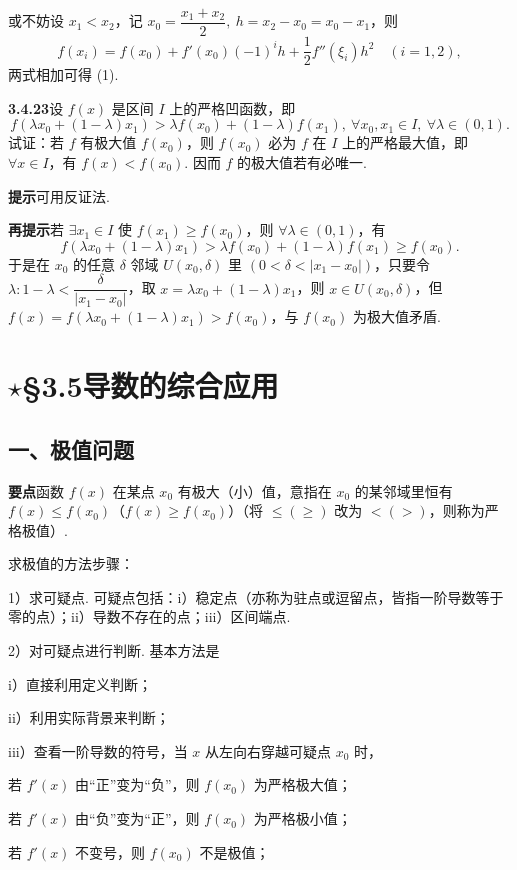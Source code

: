 \documentclass[UTF8,12pt,a4paper,fontset=fandol]{ctexart}
\begin{document}
或不妨设 $x_1<x_2$，记 $x_0=\dfrac{x_1+x_2}2,\ h=x_2-x_0=x_0-x_1$，则
\[
  f(x_i)=f(x_0)+f'(x_0)(-1)^ih+\frac12f''(\xi_i)h^2\quad(i=1,2),
\]
两式相加可得 (1).

\noindent\textbf{3.4.23}\quad 设 $f(x)$ 是区间 $I$ 上的严格凹函数，即
\[
  f(\lambda x_0+(1-\lambda)x_1)>\lambda f(x_0)+(1-\lambda)f(x_1),\ \forall x_0,x_1\in I,\ \forall\lambda\in(0,1).
\]
试证：若 $f$ 有极大值 $f(x_0)$，则 $f(x_0)$ 必为 $f$ 在 $I$ 上的严格最大值，即 $\forall x\in I$，有 $f(x)<f(x_0)$. 因而 $f$ 的极大值若有必唯一.

\noindent\textbf{提示}\quad 可用反证法.

\noindent\textbf{再提示}\quad 若 $\exists x_1\in I$ 使 $f(x_1)\ge f(x_0)$，则 $\forall\lambda\in(0,1)$，有
\[
  f(\lambda x_0+(1-\lambda)x_1)>
  \lambda f(x_0)+(1-\lambda)f(x_1)\ge f(x_0).
\]
于是在 $x_0$ 的任意 $\delta$ 邻域 $U(x_0,\delta)$ 里 $(0<\delta<|x_1-x_0|)$，只要令 $\lambda:1-\lambda<\dfrac{\delta}{|x_1-x_0|}$，取 $x=\lambda x_0+(1-\lambda)x_1$，则 $x\in U(x_0,\delta)$，但 $f(x)=f(\lambda x_0+(1-\lambda)x_1)>f(x_0)$，与 $f(x_0)$ 为极大值矛盾.

\section*{$\star$§3.5\quad 导数的综合应用}

\subsection*{一、极值问题}

\noindent\textbf{要点}\quad 函数 $f(x)$ 在某点 $x_0$ 有极大（小）值，意指在 $x_0$ 的某邻域里恒有 $f(x)\le f(x_0)$（$f(x)\ge f(x_0)$）（将 $\le(\ge)$ 改为 $< (>)$，则称为严格极值）.

求极值的方法步骤：

1）求可疑点. 可疑点包括：i）稳定点（亦称为驻点或逗留点，皆指一阶导数等于零的点）；ii）导数不存在的点；iii）区间端点.

2）对可疑点进行判断. 基本方法是

i）直接利用定义判断；

ii）利用实际背景来判断；

iii）查看一阶导数的符号，当 $x$ 从左向右穿越可疑点 $x_0$ 时，

若 $f'(x)$ 由“正”变为“负”，则 $f(x_0)$ 为严格极大值；

若 $f'(x)$ 由“负”变为“正”，则 $f(x_0)$ 为严格极小值；

若 $f'(x)$ 不变号，则 $f(x_0)$ 不是极值；
\end{document}
